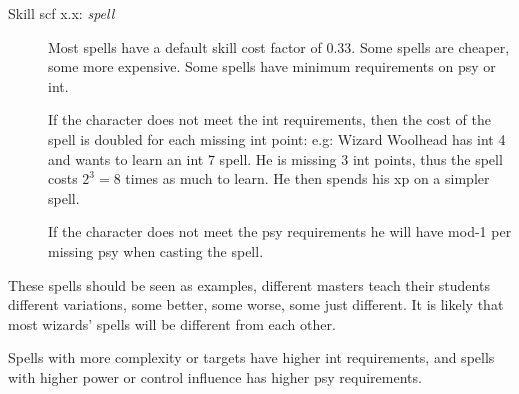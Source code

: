 \begin{description}

\item[Skill scf x.x: \emph{spell}] Most spells have a default skill cost factor of 0.33. Some spells are cheaper, some more expensive. Some spells have minimum requirements on psy or int. 

If the character does not meet the int requirements, then the cost of the spell is doubled for each missing int point: e.g: Wizard Woolhead has int 4 and wants to learn an int 7 spell. He is missing 3 int points, thus the spell costs $2^3=8$ times as much to learn. He then spends his xp on a simpler spell.

If the character does not meet the psy requirements he will have mod-1 per missing psy when casting the spell.

\end{description}

These spells should be seen as examples, different masters teach their students different variations, some better, some worse, some just different. It is likely that most wizards' spells will be different from each other.

Spells with more complexity or targets have higher int requirements, and spells with higher power or control influence has higher psy requirements.








%
%
%



